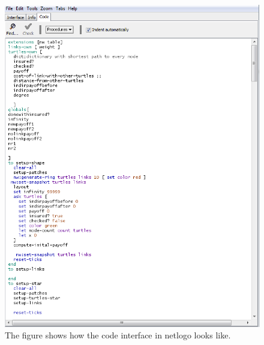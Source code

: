 \begin{figure}[h]
\centering
  \includegraphics[width=0.9\linewidth]{../Figures/netlogocodeexample.png}
  \caption{\label{fig:netlogo-code} The figure shows how the code interface in netlogo looks like.}

\end{figure}



